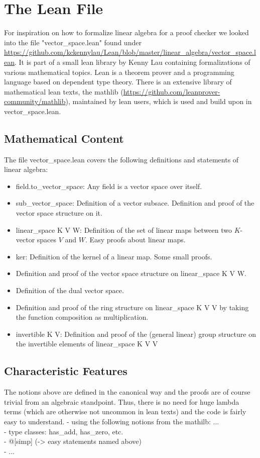 \documentclass[11pt]{article}
\begin{document}
\newpage
\lstset{style=lean}
\section{The Lean File}
For inspiration on how to formalize linear algebra for a proof checker we looked into the file "vector\_space.lean" found under \url{https://github.com/kckennylau/Lean/blob/master/linear_algebra/vector_space.lean}. It is part of a small lean library by Kenny Lau containing formalizations of various mathematical topics. Lean is a theorem prover and a programming language based on dependent type theory. There is an extensive library of mathematical lean texts, the mathlib (\url{https://github.com/leanprover-community/mathlib}), maintained by lean users, which is used and build upon in vector\_space.lean.



\subsection{Mathematical Content}
The file vector\_space.lean covers the following definitions and statements of linear algebra:
\begin{itemize}
\item {\lean field.to\_vector\_space}: Any field is a vector space over itself.
\item {\lean sub\_vector\_space}: Definition of a vector subsace. Definition and proof of the vector space structure on it.
\item {\lean linear\_space K V W}: Definition of the set of linear maps between two $K$-vector spaces $V$ and $W$. Easy proofs about linear maps.
\item {\lean ker}: Definition of the kernel of a linear map. Some small proofs.
\item Definition and proof of the vector space structure on {\lean linear\_space K V W}.
\item Definition of the dual vector space.
\item Definition and proof of the ring structure on {\lean linear\_space K V V} by taking the function composition as multiplication.
\item {\lean invertible K V}: Definition and proof of the (general linear) group structure on the invertible elements of {\lean linear\_space K V V}
\end{itemize}



\subsection{Characteristic Features}
The notions above are defined in the canonical way and the proofs are of course trivial from an algebraic standpoint. Thus, there is no need for huge lambda terms (which are otherwise not uncommon in lean texts) and the code is fairly easy to understand.
- using the following notions from the mathilb: ... \\
- type classes: has\_add, has\_zero, etc. \\
- @[simp] (-> easy statements named above)\\
- ...
\end{document}
